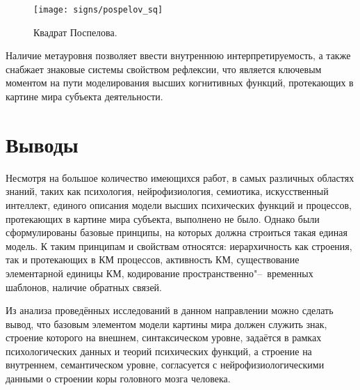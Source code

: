 \begin{figure}[h]
	\centering
	\texttt{[image: signs/pospelov\_sq]}
	\caption{Квадрат Поспелова.}
	\label{fg:pospelov_sq}
\end{figure}
	
Наличие метауровня позволяет ввести внутреннюю интерпретируемость, а также снабжает знаковые системы свойством рефлексии, что является ключевым моментом на пути моделирования высших когнитивных функций, протекающих в картине мира субъекта деятельности.


\section{Выводы} \label{sect:concl}

Несмотря на большое количество имеющихся работ, в самых различных областях знаний, таких как психология, нейрофизиология, семиотика, искусственный интеллект, единого описания модели высших психических функций и процессов, протекающих в картине мира субъекта, выполнено не было. Однако были сформулированы базовые принципы, на которых должна строиться такая единая модель. К таким принципам и свойствам относятся: иерархичность как строения, так и протекающих в КМ процессов, активность КМ, существование элементарной единицы КМ, кодирование пространственно"--~временных шаблонов, наличие обратных связей. 

Из анализа проведённых исследований в данном направлении можно сделать вывод, что базовым элементом модели картины мира должен служить знак, строение которого на внешнем, синтаксическом уровне, задаётся в рамках психологических данных и теорий психических функций, а строение на внутреннем, семантическом уровне, согласуется с нейрофизиологическими данными о строении коры головного мозга человека.

\clearpage